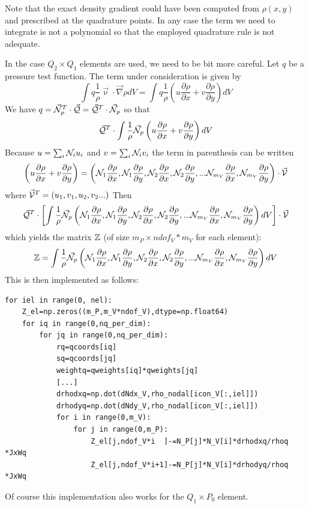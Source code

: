 Note that the exact density gradient could have been computed from $\rho(x,y)$
and prescribed at the quadrature points. 
In any case the term we need to integrate is not a polynomial so that 
the employed quadrature rule is not adequate.

In the case $Q_2\times Q_1$ elements are used, we need to be  
bit more careful. Let $q$ be a pressure test function.
The term under consideration is given by
\[
\int q \frac{1}{\rho}  \vec\upnu \cdot \vec\nabla \rho dV
= 
\int q \frac{1}{\rho}  \left( u \frac{\partial \rho}{\partial x} + v \frac{\partial \rho}{\partial y}\right) dV
\]
We have $q= \vec{{\mathcal{N}}}_p^T \cdot \vec{\cal Q} =  \vec{\cal Q}^T \cdot \vec{{\mathcal{N}}}_p$ so that
\[
\vec{\cal Q}^T \cdot \int \frac{1}{\rho} \vec{{\mathcal{N}}}_p  
\left( u \frac{\partial \rho}{\partial x} + v \frac{\partial \rho}{\partial y}\right) dV
\]
Because $u = \sum_i {\mathcal{N}}_i u_i$ and $v = \sum_i {\mathcal{N}}_i v_i$ the term in parenthesis can be written
\[
\left( u \frac{\partial \rho}{\partial x} + v \frac{\partial \rho}{\partial y}\right) 
=
\left( 
{\mathcal{N}}_1 \frac{\partial \rho}{\partial x} , {\mathcal{N}}_1 \frac{\partial \rho}{\partial y},
{\mathcal{N}}_2 \frac{\partial \rho}{\partial x} , {\mathcal{N}}_2 \frac{\partial \rho}{\partial y},
...
{\mathcal{N}}_{m_V} \frac{\partial \rho}{\partial x} , {\mathcal{N}}_{m_V} \frac{\partial \rho}{\partial y} \right)
\cdot 
\vec{\cal V}
\]
where $\vec{\cal V}^T=(u_1,v_1,u_2,v_2...)$
Then 
\[
\vec{\cal Q}^T \cdot 
\left[\int \frac{1}{\rho} \vec{{\mathcal{N}}}_p  
\left( 
{\mathcal{N}}_1 \frac{\partial \rho}{\partial x} , {\mathcal{N}}_1 \frac{\partial \rho}{\partial y},
{\mathcal{N}}_2 \frac{\partial \rho}{\partial x} , {\mathcal{N}}_2 \frac{\partial \rho}{\partial y},
...
{\mathcal{N}}_{m_V} \frac{\partial \rho}{\partial x} , {\mathcal{N}}_{m_V} \frac{\partial \rho}{\partial y} \right)
dV 
\right]
\cdot 
\vec{\cal V}
\]
which yields the matrix ${\mathbb{Z}}$ (of size $m_P \times ndof_V*m_V$ for each element):
\[
{\mathbb{Z}} = \int \frac{1}{\rho} \vec{{\mathcal{N}}}_p  
\left( 
{\mathcal{N}}_1 \frac{\partial \rho}{\partial x} , {\mathcal{N}}_1 \frac{\partial \rho}{\partial y},
{\mathcal{N}}_2 \frac{\partial \rho}{\partial x} , {\mathcal{N}}_2 \frac{\partial \rho}{\partial y},
...
{\mathcal{N}}_{m_V} \frac{\partial \rho}{\partial x} , {\mathcal{N}}_{m_V} \frac{\partial \rho}{\partial y} \right)
dV 
\]
This is then implemented as follows:

\begin{lstlisting}
for iel in range(0, nel):
    Z_el=np.zeros((m_P,m_V*ndof_V),dtype=np.float64)
    for iq in range(0,nq_per_dim):
        for jq in range(0,nq_per_dim):
            rq=qcoords[iq]
            sq=qcoords[jq]
            weightq=qweights[iq]*qweights[jq]
            [...]
            drhodxq=np.dot(dNdx_V,rho_nodal[icon_V[:,iel]])
            drhodyq=np.dot(dNdy_V,rho_nodal[icon_V[:,iel]])
            for i in range(0,m_V):
                for j in range(0,m_P):
                    Z_el[j,ndof_V*i  ]-=N_P[j]*N_V[i]*drhodxq/rhoq *JxWq 
                    Z_el[j,ndof_V*i+1]-=N_P[j]*N_V[i]*drhodyq/rhoq *JxWq 
\end{lstlisting}
Of course this implementation also works for the $Q_1\times P_0$ element.

